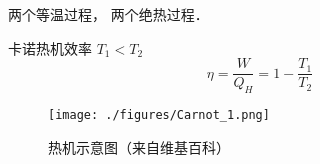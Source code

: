 
两个等温过程， 两个绝热过程．

卡诺热机效率 $T_1 < T_2$
\begin{equation}
\eta = \frac{W}{Q_H} = 1 - \frac{T_1}{T_2}
\end{equation}

\begin{figure}[ht]
\centering
\texttt{[image: ./figures/Carnot\_1.png]}
\caption{热机示意图（来自维基百科）} \label{Carnot_fig1}


\end{figure}
